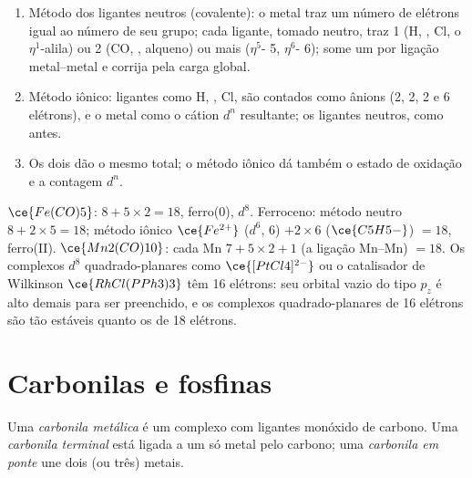 \begin{method}\label{met:b3:organometallic-bonding:count}
\begin{enumerate}
  \item Método dos ligantes neutros (covalente): o metal traz um número de elétrons igual ao
        número de seu grupo; cada ligante, tomado neutro, traz 1 (H, , Cl, o
        $\eta^1$-alila) ou 2 (CO, , alqueno) ou mais ($\eta^5$- 5, $\eta^6$- 6); some um por
        ligação metal--metal e corrija pela carga global.
  \item Método iônico: ligantes como H, , Cl,  são contados como ânions (2, 2,
        2 e 6 elétrons), e o metal como o cátion $d^n$ resultante; os ligantes neutros,
        como antes.
  \item Os dois dão o mesmo total; o método iônico dá também o estado de oxidação
        e a contagem $d^n$.
\end{enumerate}
\end{method}

\begin{example}[Contagem]\label{ex:b3:organometallic-bonding:count}
$\ce{Fe(CO)5}$: $8 + 5 \times 2 = 18$, ferro(0), $d^8$. Ferroceno: método neutro $8 + 2 \times 5 = 18$; método iônico
$\ce{Fe^{2+}}$ ($d^6$, 6) $+ 2 \times 6$ ($\ce{C5H5-}$) $= 18$, ferro(II). $\ce{Mn2(CO)10}$: cada Mn $7 + 5 \times 2 + 1$ (a ligação
Mn--Mn) $= 18$. Os complexos $d^8$ quadrado-planares como $\ce{[PtCl4]^{2-}}$ ou o catalisador de Wilkinson
$\ce{RhCl(PPh3)3}$ têm 16 elétrons: seu orbital vazio do tipo $p_z$ é alto demais para ser preenchido, e
os complexos quadrado-planares de 16 elétrons são tão estáveis quanto os de 18 elétrons.
\end{example}

\section{Carbonilas e fosfinas}

\begin{definition}\label{def:b3:organometallic-bonding:carbonyl}
Uma \emph{carbonila metálica} é um complexo com ligantes
monóxido de carbono. Uma \emph{carbonila terminal} está ligada a um
só metal pelo carbono; uma \emph{carbonila em ponte} une
dois (ou três) metais.
\end{definition}

